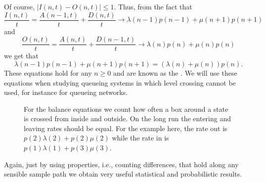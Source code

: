 Of course, $|I(n,t)-O(n,t)|\leq 1$. Thus, from the fact that
\begin{equation*}
  \frac{I(n,t)}t = \frac{A(n-1,t)}t + \frac{D(n,t)}t \to \lambda(n-1) p(n-1) + 
\mu(n+1) p(n+1)
\end{equation*}
and 
\begin{equation*}
  \frac{O(n,t)}t = \frac{A(n,t)}t + \frac{D(n-1,t)}t \to \lambda(n) p(n) + 
\mu(n) p(n)
\end{equation*}
we get that
\begin{equation*}
  \lambda(n-1)p(n-1)+\mu(n+1)p(n+1) = (\lambda(n)+\mu(n))p(n).
\end{equation*}
These equations hold for any $n\geq 0$ and are known as the
.  We will use these equations when studying
queueing systems in which level crossing cannot be used, for instance
for queueing networks.

\begin{figure}[t]
  \centering
{}
\caption{ For the balance equations we count how often a box around a
  state is crossed from inside and outside. On the long run the
  entering and leaving rates should be equal. For the example here,
  the rate out is $p(2)\lambda(2) + p(2) \mu(2)$ while the rate in is
  $p(1)\lambda(1)+p(3)\mu(3)$.}
\label{fig:balance}
\end{figure}


Again, just by using properties, i.e., counting differences, that hold
along any sensible sample path we obtain very useful statistical and
probabilistic results.


